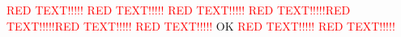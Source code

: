 \textcolor{red}{RED TEXT!!!!!}
\textcolor{red}{RED TEXT!!!!!} \textcolor{red}{RED TEXT!!!!!}
\textcolor{red}{RED TEXT!!!!!}\textcolor{red}{RED TEXT!!!!!}\textcolor{red}{RED TEXT!!!!!}
\textcolor{red}{RED TEXT!!!!!}
OK
\textcolor{red}{RED TEXT!!!!!}
\textcolor{red}{RED TEXT!!!!!}